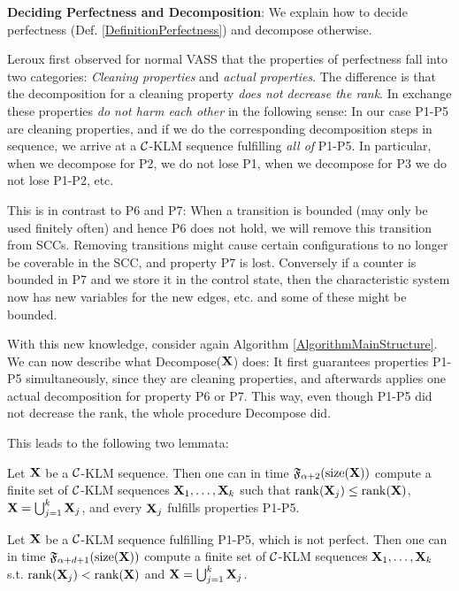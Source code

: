 \textbf{Deciding Perfectness and Decomposition}: We explain how to decide perfectness (Def. \ref{DefinitionPerfectness}) and decompose otherwise.

Leroux \cite{LerouxS19} first observed for normal VASS that the properties of perfectness fall into two categories: \emph{Cleaning properties} and \emph{actual properties}. The difference is that the decomposition for a cleaning property \emph{does not decrease the rank}. In exchange these properties \emph{do not harm each other} in the following sense: In our case P1-P5 are cleaning properties, and if we do the corresponding decomposition steps in sequence, we arrive at a \(\mathcal{C}\)-KLM sequence fulfilling \emph{all of} P1-P5. In particular, when we decompose for P2, we do not lose P1, when we decompose for P3 we do not lose P1-P2, etc. 

This is in contrast to P6 and P7: When a transition is bounded (may only be used finitely often) and hence P6 does not hold, we will remove this transition from SCCs. Removing transitions might cause certain configurations to no longer be coverable in the SCC, and property P7 is lost. Conversely if a counter is bounded in P7 and we store it in the control state, then the characteristic system now has new variables for the new edges, etc. and some of these might be bounded.

With this new knowledge, consider again Algorithm \ref{AlgorithmMainStructure}. We can now describe what Decompose(\(\mathbf{X}\)) does: It first guarantees properties P1-P5 simultaneously, since they are cleaning properties, and afterwards applies one actual decomposition for property P6 or P7. This way, even though P1-P5 did not decrease the rank, the whole procedure Decompose did.

This leads to the following two lemmata:

\begin{lemma}[Cleaning] \label{LemmaCleaning}
Let \(\mathbf{X}\) be a \(\mathcal{C}\)-KLM sequence. Then one can in time \(\mathfrak{F}_{\alpha+2}(\operatorname{size}(\mathbf{X}))\) compute a finite set of \(\mathcal{C}\)-KLM sequences \(\mathbf{X}_1, \dots, \mathbf{X}_k\) such that \(\operatorname{rank}(\mathbf{X}_j) \leq \operatorname{rank}(\mathbf{X})\), \(\mathbf{X}=\bigcup_{j=1}^k \mathbf{X}_j\), and every \(\mathbf{X}_j\) fulfills properties P1-P5.
\end{lemma}

\begin{lemma}[Decomposition] \label{LemmaActualDecomposition}
Let \(\mathbf{X}\) be a \(\mathcal{C}\)-KLM sequence fulfilling P1-P5, which is not perfect. Then one can in time \(\mathfrak{F}_{\alpha+d+1}(\operatorname{size}(\mathbf{X}))\) compute a finite set of \(\mathcal{C}\)-KLM sequences \(\mathbf{X}_1, \dots, \mathbf{X}_k\) s.t. \(\operatorname{rank}(\mathbf{X}_j) < \operatorname{rank}(\mathbf{X})\) and \(\mathbf{X}=\bigcup_{j=1}^k \mathbf{X}_j\).
\end{lemma}

